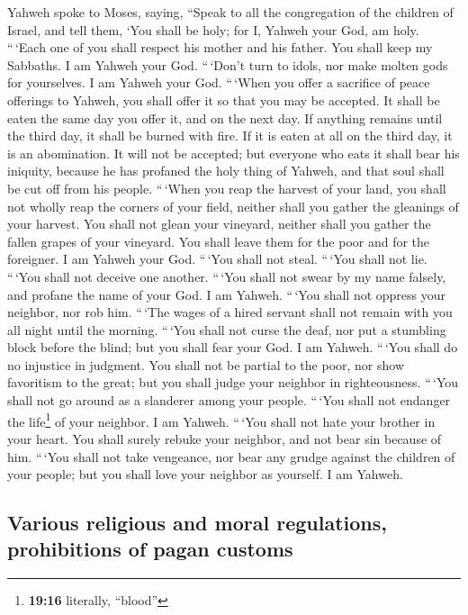  Yahweh spoke to Moses, saying,  ``Speak to
all the congregation of the children of Israel, and tell them, `You
shall be holy; for I, Yahweh your God, am holy.  ``\,`Each
one of you shall respect his mother and his father. You shall keep my
Sabbaths. I am Yahweh your God.  ``\,`Don't turn to idols,
nor make molten gods for yourselves. I am Yahweh your God.
 ``\,`When you offer a sacrifice of peace offerings to
Yahweh, you shall offer it so that you may be accepted. 
It shall be eaten the same day you offer it, and on the next day. If
anything remains until the third day, it shall be burned with fire.
 If it is eaten at all on the third day, it is an
abomination. It will not be accepted;  but everyone who
eats it shall bear his iniquity, because he has profaned the holy thing
of Yahweh, and that soul shall be cut off from his people.
 ``\,`When you reap the harvest of your land, you shall
not wholly reap the corners of your field, neither shall you gather the
gleanings of your harvest.  You shall not glean your
vineyard, neither shall you gather the fallen grapes of your vineyard.
You shall leave them for the poor and for the foreigner. I am Yahweh
your God.  ``\,`You shall not steal. ``\,`You shall not
lie. ``\,`You shall not deceive one another.  ``\,`You
shall not swear by my name falsely, and profane the name of your God. I
am Yahweh.  ``\,`You shall not oppress your neighbor, nor
rob him. ``\,`The wages of a hired servant shall not remain with you all
night until the morning.  ``\,`You shall not curse the
deaf, nor put a stumbling block before the blind; but you shall fear
your God. I am Yahweh.  ``\,`You shall do no injustice in
judgment. You shall not be partial to the poor, nor show favoritism to
the great; but you shall judge your neighbor in righteousness.
 ``\,`You shall not go around as a slanderer among your
people. ``\,`You shall not endanger the life\footnote{\textbf{19:16}
  literally, ``blood''} of your neighbor. I am Yahweh. 
``\,`You shall not hate your brother in your heart. You shall surely
rebuke your neighbor, and not bear sin because of him. 
``\,`You shall not take vengeance, nor bear any grudge against the
children of your people; but you shall love your neighbor as yourself. I
am Yahweh.

\hypertarget{various-religious-and-moral-regulations-prohibitions-of-pagan-customs}{%
\subsection{Various religious and moral regulations, prohibitions of
pagan
customs}\label{various-religious-and-moral-regulations-prohibitions-of-pagan-customs}}

